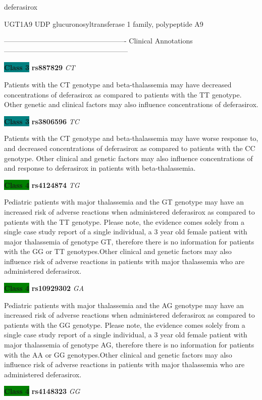 \documentclass{resume} %
\begin{document}
\begin{rSection}{ deferasirox }
\begin{rSubsection}{ UGT1A9 }{ UDP glucuronosyltransferase 1 family, polypeptide A9 }{}{}
\item[] ---------------------------------------------------- Clinical Annotations -----------------------------------------------------\newline
\item \textbf{\colorbox{teal} {Class 3}} \textbf{ rs887829 } \textit{ CT }
\item[] Patients with the CT genotype and beta-thalassemia may have decreased concentrations of deferasirox as compared to patients with the TT genotype. Other genetic and clinical factors may also influence concentrations of deferasirox.\item \textbf{\colorbox{teal} {Class 3}} \textbf{ rs3806596 } \textit{ TC }
\item[] Patients with the CT genotype and beta-thalassemia may have worse response to, and decreased concentrations of deferasirox as compared to patients with the CC genotype. Other clinical and genetic factors may also influence concentrations of and response to deferasirox in patients with beta-thalassemia.\item \textbf{\colorbox{green} {Class 4}} \textbf{ rs4124874 } \textit{ TG }
\item[] Pediatric patients with major thalassemia and the GT genotype may have an increased risk of adverse reactions when administered deferasirox as compared to patients with the TT genotype. Please note, the evidence comes solely from a single case study report of a single individual, a 3 year old female patient with major thalassemia of genotype GT, therefore there is no information for patients with the GG or TT genotypes.Other clinical and genetic factors may also influence risk of adverse reactions in patients with major thalassemia who are administered deferasirox. \item \textbf{\colorbox{green} {Class 4}} \textbf{ rs10929302 } \textit{ GA }
\item[] Pediatric patients with major thalassemia and the AG genotype may have an increased risk of adverse reactions when administered deferasirox as compared to patients with the GG genotype. Please note, the evidence comes solely from a single case study report of a single individual, a 3 year old female patient with major thalassemia of genotype AG, therefore there is no information for patients with the AA or GG genotypes.Other clinical and genetic factors may also influence risk of adverse reactions in patients with major thalassemia who are administered deferasirox.\item \textbf{\colorbox{green} {Class 4}} \textbf{ rs4148323 } \textit{ GG }

\end{rSubsection}
\end{rSection}
\end{document}
